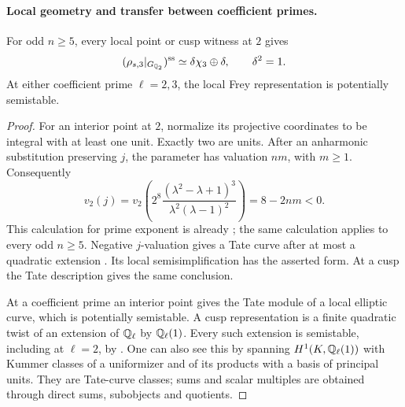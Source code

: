 \paragraph{Local geometry and transfer between coefficient primes.}

\begin{lemma}\label{lem:frey-local-two}
For odd \(n\ge5\), every local point or cusp witness at \(2\) gives
\[
 (\rho_{s,3}|_{G_{\mathbb Q_2}})^{\mathrm{ss}}
 \simeq\delta\chi_3\oplus\delta,\qquad \delta^2=1.
\]
At either coefficient prime \(\ell=2,3\), the local Frey representation
is potentially semistable.
\end{lemma}
\begin{proof}
For an interior point at \(2\), normalize its projective coordinates
to be integral with at least one unit. Exactly two are units.
After an anharmonic substitution preserving \(j\), the parameter
has valuation \(nm\), with \(m\ge1\). Consequently
\[
 v_2(j)=v_2\!\left(
 2^8\frac{(\lambda^2-\lambda+1)^3}{\lambda^2(\lambda-1)^2}
 \right)=8-2nm<0.
\]
This calculation for prime exponent is already
\cite[Lemmas~5.11--5.12, pp.~21--22]{Steklov2026}; the same calculation
applies to every odd \(n\ge5\).
Negative \(j\)-valuation gives a Tate curve after at most a quadratic
extension \cite[IV Appendix A.1.1--A.1.2, IV-29--32]{Serre1989}.
Its local semisimplification has the asserted form. At a cusp the
Tate description gives the same conclusion.

At a coefficient prime an interior point gives the Tate module of a
local elliptic curve, which is potentially semistable.
A cusp representation is a finite quadratic twist of an extension of
\(\mathbb Q_\ell\) by \(\mathbb Q_\ell(1)\).
Every such extension is semistable, including at \(\ell=2\), by
\cite[Lemma~8.3.9, p.~125]{BrinonConrad2009}.
One can also see this by spanning \(H^1(K,\mathbb Q_\ell(1))\) with Kummer
classes of a uniformizer and of its products with a basis of principal
units. They are Tate-curve classes; sums and scalar multiples are
obtained through direct sums, subobjects and quotients.
\end{proof}

